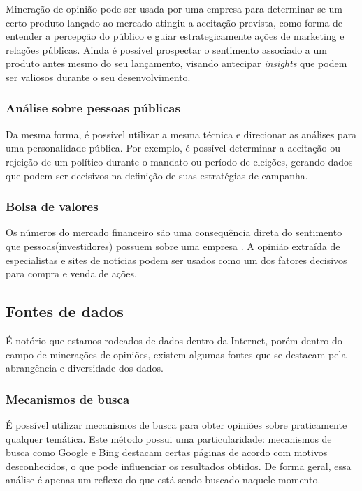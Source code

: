 Mineração de opinião pode ser usada por uma empresa para determinar se um certo produto lançado ao mercado atingiu a aceitação prevista, como forma de entender a percepção do público e guiar estrategicamente ações de marketing e relações públicas. Ainda é possível prospectar o sentimento associado a um produto antes mesmo do seu lançamento, visando antecipar \textit{insights} que podem ser valiosos durante o seu desenvolvimento.

\subsubsection{Análise sobre pessoas públicas}

Da mesma forma, é possível utilizar a mesma técnica e direcionar as análises para uma personalidade pública. Por exemplo, é possível determinar a aceitação ou rejeição de um político durante o mandato ou período de eleições, gerando dados que podem ser decisivos na definição de suas estratégias de campanha. 

\subsubsection{Bolsa de valores}

Os números do mercado financeiro são uma consequência direta do sentimento que pessoas(investidores) possuem sobre uma empresa \cite{villela2013financcas}. A opinião extraída de especialistas e sites de notícias podem ser usados como um dos fatores decisivos para compra e venda de ações.

\subsection{Fontes de dados}

É notório que estamos rodeados de dados dentro da Internet, porém dentro do campo de minerações de opiniões, existem algumas fontes que se destacam pela abrangência e diversidade dos dados.

\subsubsection{Mecanismos de busca}

É possível utilizar mecanismos de busca para obter opiniões sobre praticamente qualquer temática. Este método possui uma particularidade: mecanismos de busca como Google e Bing destacam certas páginas de acordo com motivos desconhecidos, o que pode influenciar os resultados obtidos. De forma geral, essa análise é apenas um reflexo do que está sendo buscado naquele momento.

